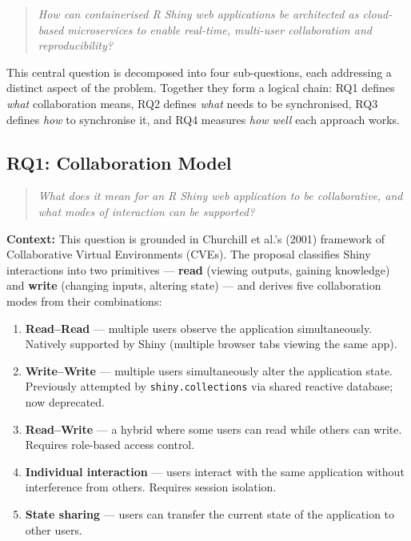 \documentclass[12pt,a4paper]{article}
\begin{document}
\begin{quote}
\textit{How can containerised R Shiny web applications be architected as cloud-based microservices to enable real-time, multi-user collaboration and reproducibility?}
\end{quote}

This central question is decomposed into four sub-questions, each addressing a distinct aspect of the problem. Together they form a logical chain: RQ1 defines \textit{what} collaboration means, RQ2 defines \textit{what} needs to be synchronised, RQ3 defines \textit{how} to synchronise it, and RQ4 measures \textit{how well} each approach works.

\subsection{RQ1: Collaboration Model}

\begin{quote}
\textit{What does it mean for an R Shiny web application to be collaborative, and what modes of interaction can be supported?}
\end{quote}

\textbf{Context:} This question is grounded in Churchill et al.'s (2001) framework of Collaborative Virtual Environments (CVEs). The proposal classifies Shiny interactions into two primitives --- \textbf{read} (viewing outputs, gaining knowledge) and \textbf{write} (changing inputs, altering state) --- and derives five collaboration modes from their combinations:

\begin{enumerate}[nosep]
  \item \textbf{Read--Read} --- multiple users observe the application simultaneously. Natively supported by Shiny (multiple browser tabs viewing the same app).
  \item \textbf{Write--Write} --- multiple users simultaneously alter the application state. Previously attempted by \texttt{shiny.collections} via shared reactive database; now deprecated.
  \item \textbf{Read--Write} --- a hybrid where some users can read while others can write. Requires role-based access control.
  \item \textbf{Individual interaction} --- users interact with the same application without interference from others. Requires session isolation.
  \item \textbf{State sharing} --- users can transfer the current state of the application to other users.
\end{enumerate}
\end{document}
